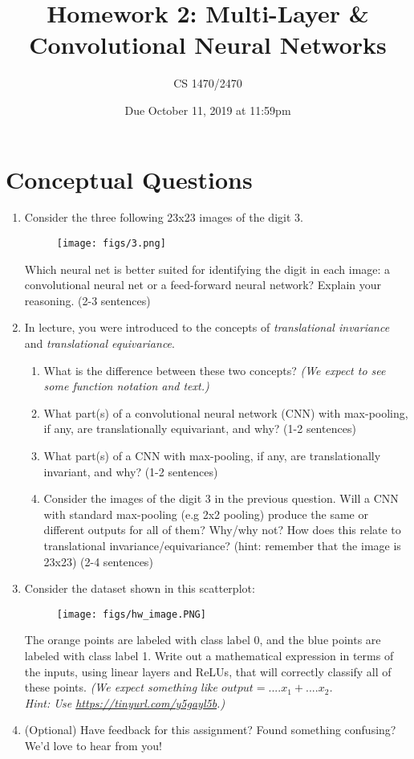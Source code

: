 \documentclass{article}
\title{Homework 2: Multi-Layer \& Convolutional Neural Networks}
\date{Due October 11, 2019 at 11:59pm}
\author{CS 1470/2470}
\begin{document}
\maketitle

\section{Conceptual Questions}
\begin{enumerate}
\item
Consider the three following 23x23 images of the digit 3. \\

\begin{figure}[H]
    \centering
    \texttt{[image: figs/3.png]}
    \label{fig:3}
\end{figure}
Which neural net is better suited for identifying the digit in each image: a convolutional neural net or a feed-forward neural network? Explain your reasoning. (2-3 sentences)

\item
In lecture, you were introduced to the concepts of \emph{translational invariance} and \emph{translational equivariance}.
\begin{enumerate}
    \item What is the difference between these two concepts? \emph{(We expect to see some function notation and text.)}
    \item What part(s) of a convolutional neural network (CNN) with max-pooling, if any, are translationally equivariant, and why? (1-2 sentences)
    \item What part(s) of a CNN with max-pooling, if any, are translationally invariant, and why? (1-2 sentences)
    \item Consider the images of the digit 3 in the previous question. Will a CNN with standard max-pooling (e.g 2x2 pooling) produce the same or different outputs for all of them? Why/why not? How does this relate to translational invariance/equivariance? (hint: remember that the image is 23x23) (2-4 sentences)
\end{enumerate}

\item
Consider the dataset shown in this scatterplot:
\begin{figure}[H]
    \centering
    \texttt{[image: figs/hw\_image.PNG]}
    \label{fig:scatterplot}
\end{figure}
The orange points are labeled with class label 0, and the blue points are labeled with class label 1.
Write out a mathematical expression in terms of the inputs, using linear layers and ReLUs, that will correctly classify all of these points. \emph{(We expect something like $output =....x_1+....x_2$. \\
Hint: Use \url{https://tinyurl.com/y5gayl5b}.)}\\

\item (Optional) Have feedback for this assignment? Found something confusing? We'd love to hear from you!

\end{enumerate}
\end{document}
